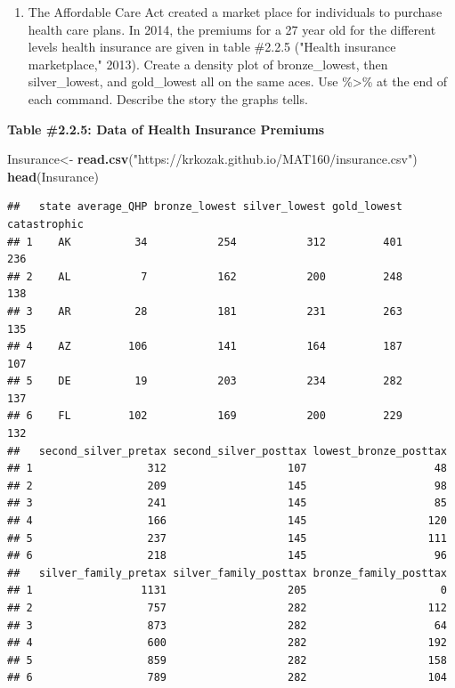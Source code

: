 \documentclass[
]{book}
\newenvironment{Shaded}{\begin{snugshade}}{\end{snugshade}}
\newcommand{\KeywordTok}[1]{\textcolor[rgb]{0.13,0.29,0.53}{\textbf{#1}}}
\newcommand{\NormalTok}[1]{#1}
\newcommand{\StringTok}[1]{\textcolor[rgb]{0.31,0.60,0.02}{#1}}
\providecommand{\tightlist}{%
  \setlength{\itemsep}{0pt}\setlength{\parskip}{0pt}}
\begin{document}
\begin{enumerate}
\def\labelenumi{\arabic{enumi}.}
\setcounter{enumi}{2}
\tightlist
\item
  The Affordable Care Act created a market place for individuals to purchase health care plans. In 2014, the premiums for a 27 year old for the different levels health insurance are given in table \#2.2.5 ("Health insurance marketplace," 2013). Create a density plot of bronze\_lowest, then silver\_lowest, and gold\_lowest all on the same aces. Use \%\textgreater\% at the end of each command. Describe the story the graphs tells.
\end{enumerate}

\textbf{Table \#2.2.5: Data of Health Insurance Premiums}

\begin{Shaded}
\begin{Highlighting}[]
\NormalTok{Insurance<-}\StringTok{ }\KeywordTok{read.csv}\NormalTok{(}\StringTok{"https://krkozak.github.io/MAT160/insurance.csv"}\NormalTok{)}
\KeywordTok{head}\NormalTok{(Insurance)}
\end{Highlighting}
\end{Shaded}

\begin{verbatim}
##   state average_QHP bronze_lowest silver_lowest gold_lowest catastrophic
## 1    AK          34           254           312         401          236
## 2    AL           7           162           200         248          138
## 3    AR          28           181           231         263          135
## 4    AZ         106           141           164         187          107
## 5    DE          19           203           234         282          137
## 6    FL         102           169           200         229          132
##   second_silver_pretax second_silver_posttax lowest_bronze_posttax
## 1                  312                   107                    48
## 2                  209                   145                    98
## 3                  241                   145                    85
## 4                  166                   145                   120
## 5                  237                   145                   111
## 6                  218                   145                    96
##   silver_family_pretax silver_family_posttax bronze_family_posttax
## 1                 1131                   205                     0
## 2                  757                   282                   112
## 3                  873                   282                    64
## 4                  600                   282                   192
## 5                  859                   282                   158
## 6                  789                   282                   104
\end{verbatim}
\end{document}

